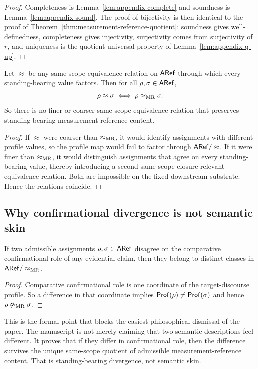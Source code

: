 \begin{proof}
Completeness is Lemma~\ref{lem:appendix-complete} and soundness is
Lemma~\ref{lem:appendix-sound}. The proof of bijectivity is then identical to the proof of
Theorem~\ref{thm:measurement-reference-quotient}: soundness gives well-definedness, completeness
gives injectivity, surjectivity comes from surjectivity of $r$, and uniqueness is the quotient universal
property of Lemma~\ref{lem:appendix-q-up}.
\end{proof}


\begin{theorem}
\label{thm:appendix-equivalence-collapse}
Let $\approx$ be any same-scope equivalence relation on $\mathsf{ARef}$ through which every standing-bearing
value factors. Then for all $\rho,\sigma\in\mathsf{ARef}$,
\[
\rho \approx \sigma \iff \rho \mathrel{\approx_{\mathrm{MR}}} \sigma.
\]
So there is no finer or coarser same-scope equivalence relation that preserves standing-bearing
measurement-reference content.
\end{theorem}

\begin{proof}
If $\approx$ were coarser than $\mathrel{\approx_{\mathrm{MR}}}$, it would identify assignments with different profile values, so the
profile map would fail to factor through $\mathsf{ARef}/\approx$. If it were finer than $\mathrel{\approx_{\mathrm{MR}}}$, it would
distinguish assignments that agree on every standing-bearing value, thereby introducing a second
same-scope closure-relevant equivalence relation. Both are impossible on the fixed downstream
substrate. Hence the relations coincide.
\end{proof}

\subsection{Why confirmational divergence is not semantic skin}

\begin{corollary}
\label{cor:appendix-confirmational-divergence}
If two admissible assignments $\rho,\sigma\in\mathsf{ARef}$ disagree on the comparative confirmational role of
any evidential claim, then they belong to distinct classes in $\mathsf{ARef}/\mathrel{\approx_{\mathrm{MR}}}$.
\end{corollary}

\begin{proof}
Comparative confirmational role is one coordinate of the target-discourse profile. So a difference in
that coordinate implies $\mathsf{Prof}(\rho)\neq\mathsf{Prof}(\sigma)$ and hence $\rho\not\mathrel{\approx_{\mathrm{MR}}}\sigma$.
\end{proof}

\begin{remark}
This is the formal point that blocks the easiest philosophical dismissal of the paper. The manuscript
is not merely claiming that two semantic descriptions feel different. It proves that if they differ in
confirmational role, then the difference survives the unique same-scope quotient of admissible
measurement-reference content. That is standing-bearing divergence, not semantic skin.
\end{remark}
